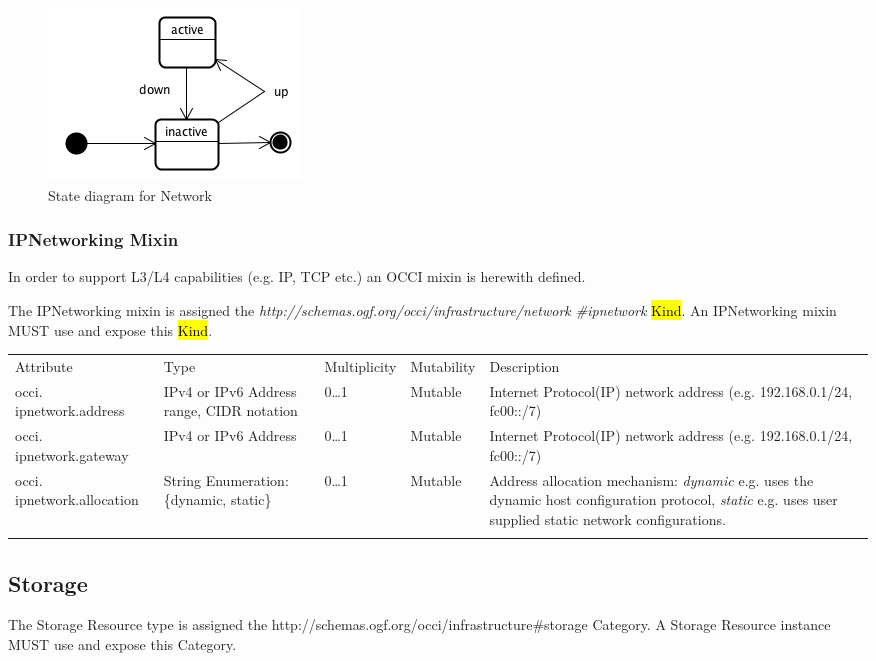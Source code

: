 \documentclass[10pt,a4paper]{article}
\begin{document}
\begin{figure}[!h]
	\centering
	\includegraphics[scale=0.4]{figs/network-state.png}
	\caption{State diagram for Network}
	\label{fig:network_state}
\end{figure}

\subsubsection{IPNetworking Mixin}

In order to support L3/L4 capabilities (e.g. IP, TCP etc.) an OCCI mixin is herewith defined. 

The IPNetworking mixin is assigned the \textit{http://schemas.ogf.org/occi/infrastructure/network
\#ipnetwork} \hl{Kind}. An IPNetworking mixin MUST use and expose this \hl{Kind}.

\begin{tabular}{lp{2.5cm}p{1cm}lp{6cm}}
\toprule
Attribute&Type&Multi\-plicity&Mutability&Description\\
\colrule
occi. ipnetwork.address & IPv4 or IPv6 Address range, CIDR notation & 0\ldots1 & Mutable & Internet Protocol(IP) network address (e.g. 192.168.0.1/24, fc00::/7)\\
occi. ipnetwork.gateway & IPv4 or IPv6 Address & 0\ldots1 & Mutable & Internet Protocol(IP) network address (e.g. 192.168.0.1/24, fc00::/7)\\
occi. ipnetwork.allocation & String Enumeration: \{dynamic, static\} & 0\ldots1 & Mutable & Address allocation mechanism: \textit{dynamic} e.g. uses the dynamic host configuration protocol, \textit{static} e.g. uses user supplied static network configurations.\\
\botrule
\end{tabular}

\subsection{Storage}
The Storage Resource type is assigned the http://schemas.ogf.org/occi/infrastructure\#storage Category. A Storage Resource instance MUST use and expose this Category.
\end{document}
